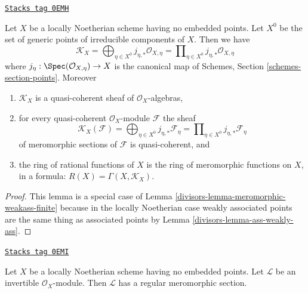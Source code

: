 \begin{lemma}
\label{divisors-lemma-quasi-coherent-K}
\href{https://stacks.math.columbia.edu/tag/0EMH}{\texttt{Stacks tag 0EMH}}

Let $X$ be a locally Noetherian scheme having no embedded points.
Let $X^0$ be the set of generic points of irreducible components of $X$.
Then we have
$$
\mathcal{K}_X =
\bigoplus\nolimits_{\eta \in X^0} j_{\eta, *}\mathcal{O}_{X, \eta} =
\prod\nolimits_{\eta \in X^0} j_{\eta, *}\mathcal{O}_{X, \eta}
$$
where $j_\eta : \Spec(\mathcal{O}_{X, \eta}) \to X$ is the canonical map
of Schemes, Section \ref{schemes-section-points}. Moreover
\begin{enumerate}
\item $\mathcal{K}_X$ is a quasi-coherent sheaf of $\mathcal{O}_X$-algebras,
\item for every quasi-coherent $\mathcal{O}_X$-module $\mathcal{F}$ the sheaf
$$
\mathcal{K}_X(\mathcal{F}) =
\bigoplus\nolimits_{\eta \in X^0} j_{\eta, *}\mathcal{F}_\eta =
\prod\nolimits_{\eta \in X^0} j_{\eta, *}\mathcal{F}_\eta
$$
of meromorphic sections of $\mathcal{F}$ is quasi-coherent, and
\item the ring of rational functions of $X$ is the ring of meromorphic
functions on $X$, in a formula: $R(X) = \Gamma(X, \mathcal{K}_X)$.
\end{enumerate}
\end{lemma}

\begin{proof}

This lemma is a special case of
Lemma \ref{divisors-lemma-meromorphic-weakass-finite}
because in the locally Noetherian case
weakly associated points are the same thing
as associated points by Lemma \ref{divisors-lemma-ass-weakly-ass}.
\end{proof}

\begin{lemma}
\label{divisors-lemma-regular-meromorphic-section-exists-noetherian}
\href{https://stacks.math.columbia.edu/tag/0EMI}{\texttt{Stacks tag 0EMI}}

Let $X$ be a locally Noetherian scheme having no embedded points.
Let $\mathcal{L}$ be an invertible $\mathcal{O}_X$-module.
Then $\mathcal{L}$ has a regular meromorphic section.
\end{lemma}

